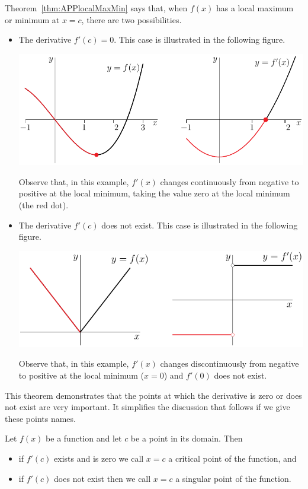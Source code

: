 Theorem~\ref{thm:APPlocalMaxMin} says that, when $f(x)$ has a local maximum or
minimum at $x=c$, there are two possibilities.
\begin{itemize}
 \item The derivative $f'(c)=0$. This case is illustrated in the following
figure.
\begin{efig}
 \begin{center}
  \includegraphics[]{localMaxMinDE}
 \end{center}
\end{efig}
Observe that, in this example, $f'(x)$ changes continuously from negative to
positive at the local minimum, taking the value zero at the local minimum (the
red dot).

\item The derivative $f'(c)$ does not exist. This case is illustrated in the
following figure.
\begin{efig}
 \begin{center}
  \includegraphics[]{localMaxMinFG}
 \end{center}
\end{efig}
Observe that, in this example, $f'(x)$ changes discontinuously from negative to
positive at the local minimum ($x=0$) and $f'(0)$ does not exist.
\end{itemize}
This theorem demonstrates that the points at which the derivative is zero or
does not exist are very important. It simplifies the discussion that follows if
we give these points names.
\begin{defn}\label{def:APPcriticalPoint} %
Let $f(x)$ be a function and let $c$ be a point in its domain. Then
\begin{itemize}
 \item if $f'(c)$ exists and is zero we call $x=c$ a critical point of the
function, and
 \item if $f'(c)$ does not exist then we call $x=c$ a singular point of the
function.
\end{itemize}
\end{defn}

